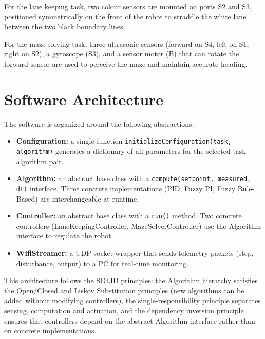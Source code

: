 For the lane keeping task, two colour sensors are mounted on ports S2 and S3, positioned symmetrically on the front of the robot to straddle the white lane between the two black boundary lines.

For the maze solving task, three ultrasonic sensors (forward on S4, left on S1, right on S2), a gyroscope (S3), and a sensor motor (B) that can rotate the forward sensor are used to perceive the maze and maintain accurate heading.

\section{Software Architecture}
\label{sec:software-arch}

The software is organized around the following abstractions:

\begin{itemize}
    \item \textbf{Configuration:} a single function \texttt{initializeConfiguration(task, algorithm)} generates a dictionary of all parameters for the selected task-algorithm pair.
    \item \textbf{Algorithm:} an abstract base class with a \texttt{compute(setpoint, measured, dt)} interface. Three concrete implementations (PID, Fuzzy PI, Fuzzy Rule-Based) are interchangeable at runtime.
    \item \textbf{Controller:} an abstract base class with a \texttt{run()} method. Two concrete controllers (LaneKeepingController, MazeSolverController) use the Algorithm interface to regulate the robot.
    \item \textbf{WifiStreamer:} a UDP socket wrapper that sends telemetry packets (step, disturbance, output) to a PC for real-time monitoring.
\end{itemize}

This architecture follows the SOLID principles: the Algorithm hierarchy satisfies the Open/Closed and Liskov Substitution principles (new algorithms can be added without modifying controllers), the single-responsibility principle separates sensing, computation and actuation, and the dependency inversion principle ensures that controllers depend on the abstract Algorithm interface rather than on concrete implementations.


